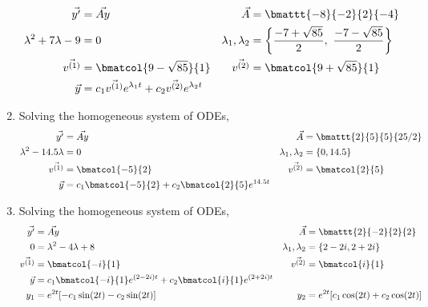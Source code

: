 \begin{enumerate}
\begin{align}
    \vec{y'}                   & = \vec{Ay}                            &
    \vec{A}                    & = \bmattt{-8}{-2}{2}{-4}                \\
    \lambda^{2} + 7\lambda - 9 & = 0                                   &
    \lambda_1, \lambda_2       & = \left\{ \frac{-7 + \sqrt{85}}{2},\
    \frac{-7 - \sqrt{85}}{2} \right\}                                    \\
    \vec{v^{(1)}}              & = \bmatcol{9 - \sqrt{85}}{1}          &
    \vec{v^{(2)}}              & = \bmatcol{9 + \sqrt{85}}{1}            \\
    \vec{y}                    & = c_1 \vec{v^{(1)}} e^{\lambda_1 t}
    + c_2 \vec{v^{(2)}} e^{\lambda_2 t}
\end{align}
\item Solving the homogeneous system of ODEs,
\begin{align}
    \vec{y'}                  & = \vec{Ay}                 &
    \vec{A}                   & = \bmattt{2}{5}{5}{25/2}     \\
    \lambda^{2} - 14.5\lambda & = 0                        &
    \lambda_1, \lambda_2      & = \left\{ 0, 14.5 \right\}   \\
    \vec{v^{(1)}}             & = \bmatcol{-5}{2}          &
    \vec{v^{(2)}}             & = \bmatcol{2}{5}             \\
    \vec{y}                   & = c_1 \bmatcol{-5}{2}
    + c_2 \bmatcol{2}{5} e^{14.5t}
\end{align}
\item Solving the homogeneous system of ODEs,
\begin{align}
    \vec{y'}             & = \vec{Ay}                              &
    \vec{A}              & = \bmattt{2}{-2}{2}{2}                    \\
    0                    & = \lambda^{2} - 4\lambda + 8            &
    \lambda_1, \lambda_2 & = \left\{ 2 - 2i, 2 + 2i \right\}         \\
    \vec{v^{(1)}}        & = \bmatcol{-i}{1}                       &
    \vec{v^{(2)}}        & = \bmatcol{i}{1}                          \\
    \vec{y}              & = c_1 \bmatcol{-i}{1} e^{(2 - 2i)t}
    + c_2 \bmatcol{i}{1} e^{(2 + 2i)t}                               \\
    y_1                  & = e^{2t} [-c_1 \sin(2t) - c_2 \sin(2t)] &
    y_2                  & = e^{2t} [c_1 \cos(2t) + c_2 \cos(2t)]

\end{align}
\end{enumerate}
